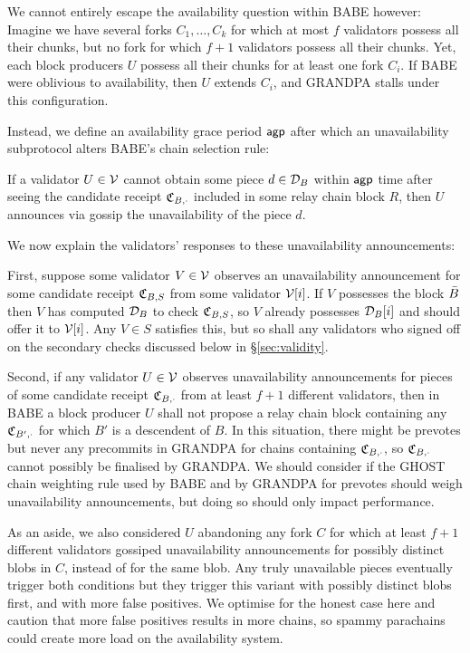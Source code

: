 We cannot entirely escape the availability question within BABE however:  Imagine we have several forks $C_1,\ldots,C_k$ for which at most $f$ validators possess all their chunks, but no fork for which $f+1$ validators possess all their chunks.  Yet, each block producers $U$ possess all their chunks for at least one fork $C_i$.  If BABE were oblivious to availability, then $U$ extends $C_i$, and GRANDPA stalls under this configuration. 

Instead, we define an availability grace period $\mathsf{agp}$ after which an unavailability subprotocol alters BABE's chain selection rule:  

If a validator $U \in \mathcal{V}$ cannot obtain some piece $d \in \mathcal{D}_B$ within $\mathsf{agp}$ time after seeing the candidate receipt $\mathfrak{C}_{B,\cdot}$ included in some relay chain block $R$, then $U$ announces via gossip the unavailability of the piece $d$. 

We now explain the validators' responses to these unavailability announcements:

First, suppose some validator $V \in \mathcal{V}$ observes an unavailability announcement for some candidate receipt $\mathfrak{C}_{B,S}$ from some validator $\mathcal{V}[i]$.  If $V$ possesses the block $\bar{B}$ then $V$ has computed $\mathcal{D}_B$ to check $\mathfrak{C}_{B,S}$, so $V$ already possesses $\mathcal{D}_B[i]$ and should offer it to $\mathcal{V}[i]$.  Any $V \in S$ satisfies this, but so shall any validators who signed off on the secondary checks discussed below in \S\ref{sec:validity}. 

Second, if any validator $U \in \mathcal{V}$ observes unavailability announcements for pieces of some candidate receipt $\mathfrak{C}_{B,\cdot}$ from at least $f+1$ different validators, then in BABE a block producer $U$ shall not propose a relay chain block containing any $\mathfrak{C}_{B',\cdot}$ for which $B'$ is a descendent of $B$.
In this situation, there might be prevotes but never any precommits in GRANDPA for chains containing  $\mathfrak{C}_{B,\cdot}$, so $\mathfrak{C}_{B,\cdot}$ cannot possibly be finalised by GRANDPA.  We should consider if the GHOST chain weighting rule used by BABE and by GRANDPA for prevotes should weigh unavailability announcements, but doing so should only impact performance.

As an aside, we also considered $U$ abandoning any fork $C$ for which at least $f+1$ different validators gossiped unavailability announcements for possibly distinct blobs in $C$, instead of for the same blob.  Any truly unavailable pieces eventually trigger both conditions but they trigger this variant with possibly distinct blobs first, and with more false positives.  We optimise for the honest case here and caution that more false positives results in more chains, so spammy parachains could create more load on the availability system.

